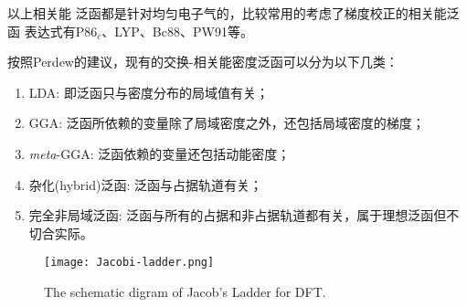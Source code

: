 以上相关能%
{泛函}都是针对均匀电子气的，比较常用的考虑了梯度校正的相关能泛函%
{表达}式有P86$_c$\cite{PRB33-8822_1986}、LYP\cite{PRB37-785_1988}、Bc88\cite{JCP88-1053_1988}、PW91\cite{PRB46-6671_1992,PRB48-4978_1993,PRB54-16533_1996,PRB57-14999_1998}等。

按照Perdew的建议\cite{Perdew-Schmidt_2001}，现有的交换-相关能密度泛函可以分为以下几类：
\begin{enumerate}
  \item LDA: 即泛函只与密度分布的局域值有关；
  \item GGA: 泛函所依赖的变量除了局域密度之外，还包括局域密度的梯度；
  \item \textit{meta}-GGA: 泛函依赖的变量还包括动能密度；
  \item {杂化(hybrid)泛函}: 泛函与占据轨道有关；
  \item 完全非局域泛函: 泛函与所有的占据和非占据轨道都有关，属于理想泛函但不%
{切合实际}。
\end{enumerate}
\begin{figure}[!h]
\centering
\texttt{[image: Jacobi-ladder.png]}
\caption{\small The schematic digram of Jacob's Ladder for DFT.\cite{Perdew-Schmidt_2001,Science298-759_2002}}
\label{Fig:Jacob-Ladder}
\end{figure}

